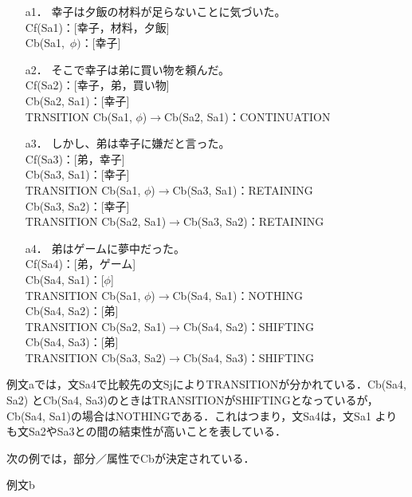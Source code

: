 \documentclass[japanese]{jnlp_1.4}
\begin{document}
\begin{itemize}
\item[a1．]
幸子は夕飯の材料が足らないことに気づいた。\\
Cf(Sa1)：[幸子，材料，夕飯]\\
Cb(Sa1,\ $\phi )$：[幸子]

\item[a2．]
そこで幸子は弟に買い物を頼んだ。\\
Cf(Sa2)：[幸子，弟，買い物]\\
Cb(Sa2, Sa1)：[幸子] \\
TRNSITION Cb(Sa1, $\phi$)$\to $Cb(Sa2, Sa1)：CONTINUATION 

\item[a3．]
しかし、弟は幸子に嫌だと言った。\\
Cf(Sa3)：[弟，幸子]\\
Cb(Sa3, Sa1)：[幸子] \\
TRANSITION Cb(Sa1, $\phi$)$\to $Cb(Sa3, Sa1)：RETAINING\\
Cb(Sa3, Sa2)：[幸子] \\
TRANSITION Cb(Sa2, Sa1)$\to $Cb(Sa3, Sa2)：RETAINING

\item[a4．]
弟はゲームに夢中だった。\\
Cf(Sa4)：[弟，ゲーム] \\
Cb(Sa4, Sa1)：[$\phi $] \\
TRANSITION Cb(Sa1, $\phi$)$\to $Cb(Sa4, Sa1)：NOTHING\\
Cb(Sa4, Sa2)：[弟] \\
TRANSITION Cb(Sa2, Sa1)$\to $Cb(Sa4, Sa2)：SHIFTING\\
Cb(Sa4, Sa3)：[弟] \\
TRANSITION Cb(Sa3, Sa2)$\to $Cb(Sa4, Sa3)：SHIFTING
\end{itemize}
\vspace{1\baselineskip}

例文aでは，文Sa4で比較先の文SjによりTRANSITIONが分かれている．Cb(Sa4, Sa2) 
とCb(Sa4, Sa3)のときはTRANSITIONがSHIFTINGとなっているが，Cb(Sa4, Sa1)の場合はNOTHINGである．これはつまり，文Sa4は，文Sa1 
よりも文Sa2やSa3との間の結束性が高いことを表している．

次の例では，部分／属性でCbが決定されている．
\vspace{1\baselineskip}

例文b

\vspace{0.5\baselineskip}
\vspace{1\baselineskip}
\end{document}
